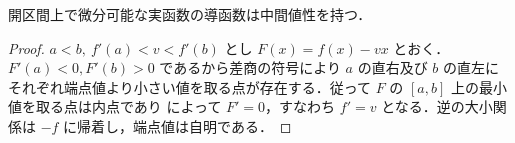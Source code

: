 \begin{prop}
開区間上で微分可能な実函数の導函数は中間値性を持つ．
\end{prop}
\begin{proof}
$a<b,\ f'(a)<v<f'(b)$ とし $F(x)=f(x)-vx$ とおく．$F'(a)<0,F'(b)>0$ であるから差商の符号により $a$ の直右及び $b$ の直左にそれぞれ端点値より小さい値を取る点が存在する．従って $F$ の $[a,b]$ 上の最小値を取る点は内点であり  によって $F'=0$，すなわち $f'=v$ となる．逆の大小関係は $-f$ に帰着し，端点値は自明である．
\end{proof}
